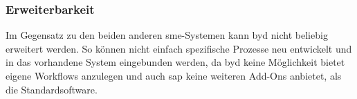 \subsubsection{Erweiterbarkeit}

Im Gegensatz zu den beiden anderen \gls{sme}-Systemen kann \gls{byd} nicht beliebig erweitert werden. So können nicht einfach spezifische Prozesse neu entwickelt und in das vorhandene System eingebunden werden, da \gls{byd} keine Möglichkeit bietet eigene Workflows anzulegen und auch \gls{sap} keine weiteren Add-Ons anbietet, als die Standardsoftware.


